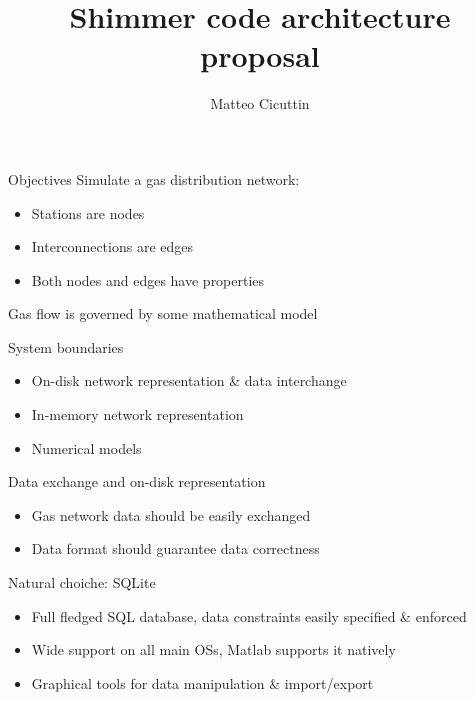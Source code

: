 \documentclass[10pt,aspectratio=169]{beamer}
\title{Shimmer code architecture proposal}
\author{Matteo Cicuttin}
\institute{DISMA - PoliTO}
\begin{document}
\maketitle

\begin{frame}{Objectives}
    Simulate a gas distribution network:
    \begin{itemize}
        \item Stations are nodes
        \item Interconnections are edges
        \item Both nodes and edges have properties
    \end{itemize}

    Gas flow is governed by some mathematical model
\end{frame}

\begin{frame}{System boundaries}
    \begin{itemize}
        \item On-disk network representation \& data interchange
        \item In-memory network representation
        \item Numerical models
    \end{itemize}
\end{frame}

\begin{frame}{Data exchange and on-disk representation}
    \begin{itemize}
        \item Gas network data should be easily exchanged
        \item Data format should guarantee data correctness
    \end{itemize}

    Natural choiche: SQLite

    \begin{itemize}
        \item Full fledged SQL database, data constraints easily specified \& enforced
        \item Wide support on all main OSs, Matlab supports it natively
        \item Graphical tools for data manipulation \& import/export
    \end{itemize}
\end{frame}
\end{document}
